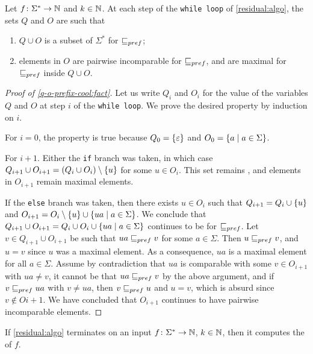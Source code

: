 \begin{fact}
    \label{q-o-prefix-cool:fact}
    Let $f \colon \Sigma^* \to \mathbb{N}$ and $k \in \mathbb{N}$.
    At each step of the \texttt{while loop}
    of \cref{residual:algo}, the sets
    $Q$ and $O$ are such that
    \begin{enumerate}
        \item $Q \cup O$ is a  subset of 
            $\Sigma^*$ for $\prefleq$;
        \item elements in $O$ are pairwise incomparable
            for $\prefleq$, and are maximal
            for $\prefleq$ inside $Q \cup O$.
    \end{enumerate}
\end{fact}
\begin{proof}[Proof of
    \cref{q-o-prefix-cool:fact}]
    Let us write $Q_i$ and $O_i$ for the value of the variables
    $Q$ and $O$ at step $i$ of the \texttt{while loop}.
    We prove the desired property by induction on $i$.

    For $i=0$, the property is true because
    $Q_0 = \mathopen{\{} \varepsilon \mathclose{\}}$ and $O_0 = \mathopen{\{} a \mid a \in \Sigma \mathclose{\}}$.

    For $i+1$. Either the \texttt{if} branch was taken, in which case $Q_{i+1}
    \cup O_{i+1} = (Q_i \cup O_i) \setminus \mathopen{\{} u \mathclose{\}}$ for some $u \in O_i$. This
    set remains , and elements in $O_{i+1}$ remain maximal
    elements. 

    If the \texttt{else} branch was taken, then there exists $u \in O_i$ such
    that $Q_{i+1} = Q_i \cup \mathopen{\{} u \mathclose{\}}$ and $O_{i+1} = O_i \setminus \mathopen{\{}  u  \mathclose{\}}
    \cup \mathopen{\{}  ua  \mid  a \in \Sigma \mathclose{\}}$. We conclude that $Q_{i+1} \cup O_{i+1} =
    Q_i \cup O_i \cup \mathopen{\{}  ua  \mid a \in \Sigma \mathclose{\}}$ continues to be  for $\prefleq$. Let $v \in Q_{i+1} \cup O_{i+1}$ be such that $ua
    \prefleq v$ for some $a \in \Sigma$. Then $u \prefleq v$, and $u = v$ since
    $u$ was a maximal element. As a consequence, $ua$ is a maximal element for
    all $a \in \Sigma$. Assume by contradiction that $ua$ is comparable with
    some $v \in O_{i+1}$ with $ua \neq v$, it cannot be that $ua \prefleq v$ by
    the above argument, and if $v \prefleq ua$ with $v \neq ua$, then $v
    \prefleq u$ and $u = v$, which is absurd since $v \not \in O{i+1}$.
    We have concluded that $O_{i+1}$ continues to have pairwise incomparable
    elements.
\end{proof}


\begin{lemma}
    \label{correct-residual:lemma}
    If \cref{residual:algo} terminates on 
    an input $f \colon \Sigma^* \to \mathbb{N}$, $k \in \mathbb{N}$,
    then it computes the  of $f$.
\end{lemma}

